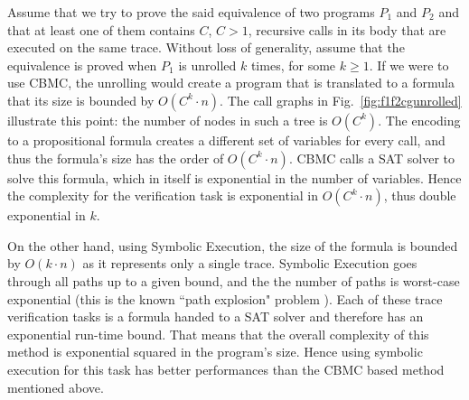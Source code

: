 Assume that we try to prove the said equivalence of two programs $P_1$ and $P_2$ and that at least one of them contains $C$, $C>1$, recursive calls in its body that are executed on the same trace. Without loss of generality, assume that the equivalence is proved when $P_1$ is unrolled $k$ times, for some $k \geq 1$. 
If we were to use CBMC, the unrolling would create a program that is translated to a formula that its size is bounded by $O(C^k{\cdot}n)$. The call graphs in Fig.~\ref{fig:f1f2cgunrolled} illustrate this point: the number of nodes in such a tree is $O(C^k)$. The encoding to a propositional formula creates a different set of variables for every call, and thus the formula's size has the order of $O(C^k{\cdot}n)$. CBMC calls a SAT solver to solve this formula, which in itself is exponential in the number of variables. Hence the complexity for the verification task is exponential in $O(C^k{\cdot}n)$, thus double exponential in $k$.

On the other hand, using Symbolic Execution, the size of the formula is bounded by $O(k{\cdot}n)$ as it represents only a single trace. Symbolic Execution goes through all paths up to a given bound, and the the number of paths is worst-case exponential (this is the known ``path explosion" problem  \cite{10.1007/978-3-540-78800-3_28}). Each of these trace verification tasks is a formula handed to a SAT solver and therefore has an exponential run-time bound. That means that the overall complexity of this method is exponential squared in the program's size. 
Hence using symbolic execution for this task has better performances than the CBMC based method mentioned above.



